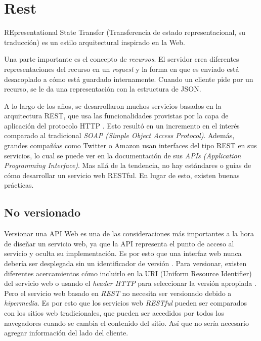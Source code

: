 \section[REST]{Rest}

REpresentational State Transfer (Transferencia de estado representacional, su traducción) es un estilo arquitectural inspirado en la Web. 

Una parte importante es el concepto de \textit{recursos}. 
El servidor crea diferentes representaciones del recurso en un \textit{request} y la forma en que es enviado está desacoplado a cómo está guardado internamente. Cuando un cliente pide por un recurso, se le da una representación con la estructura de JSON.

A lo largo de los años, se desarrollaron muchos servicios basados en la arquitectura REST, que usa las funcionalidades provistas por la capa de aplicación del protocolo HTTP \cite{RestSoap} \cite{IETF}. Esto resultó en un incremento en el interés comparado al tradicional \textit{SOAP (Simple Object Access Protocol)}. Además, grandes compañías como Twitter o Amazon usan interfaces del tipo REST en sus servicios, lo cual se puede ver en la documentación de sus \textit{APIs (Application Programming Interface)}.
Mas allá de la tendencia, no hay estándares o guias de cómo desarrollar un servicio web RESTful. En lugar de esto, existen buenas prácticas.

\subsection[No versionado]{No versionado}

Versionar una API Web es una de las consideraciones más importantes a la hora de diseñar un servicio web, ya que la API representa el punto de acceso al servicio y oculta su implementación. Es por esto que una interfaz web nunca debería ser desplegada sin un identificador de versión \cite{WAPID}. Para versionar, existen diferentes acercamientos cómo incluirlo en la URI (Uniform Resource Identifier) del servicio web o usando el \textit{header HTTP} para seleccionar la versión apropiada \cite{WAPID}. Pero el servicio web basado en \textit{REST} no necesita ser versionado debido a \textit{hipermedia}. Es por esto que los servicios web \textit{RESTful} pueden ser comparados con los sitios web tradicionales, que pueden ser accedidos por todos los navegadores cuando se cambia el contenido del sitio. Así que no sería necesario agregar información del lado del cliente.


